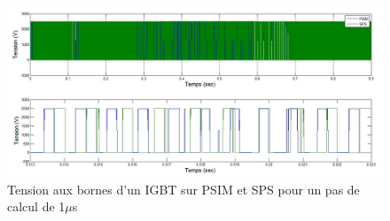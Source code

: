 \documentclass[11pt,letterpaper,final]{report}
\begin{document}
\begin{figure}[htb]
\centering
\includegraphics[scale=0.5]{Fig/DCPDCN/DCPTensionIGBT1u.jpg}
\caption{Tension aux bornes d'un IGBT sur PSIM et SPS pour un pas de calcul de 1$\mu$s}
\label{DC_IG_ten_1}
\end{figure}
\end{document}
